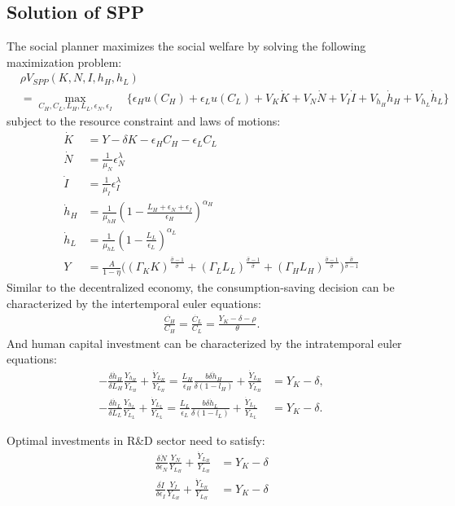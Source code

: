 \documentclass[12pt]{article}
\begin{document}
\subsection{Solution of SPP}
The social planner maximizes the social welfare by solving the following maximization problem:
\begin{align*}
&\rho V_{SPP}(K,N,I,h_H,h_L)  \\
&= \max_{C_H, C_L,L_H,L_L,\epsilon_N, \epsilon_I} \quad \{\epsilon_H u(C_H)+\epsilon_L u(C_L)+V_K\dot{K}+V_N\dot{N}+V_I\dot{I}+V_{h_H}\dot{h}_H+V_{h_L}\dot{h}_L\}
\end{align*}
subject to the resource constraint and laws of motions: 
\begin{align*}
\dot{K} &= Y-\delta K-\epsilon_H C_H-\epsilon_L C_L \\
\dot{N} &= \frac{1}{\mu_N}\epsilon_N^{\lambda} \\
\dot{I} &= \frac{1}{\mu_I}\epsilon_I^{\lambda} \\
\dot{h}_H &= \frac{1}{\mu_{hH}} (1-\frac{L_H+\epsilon_N+\epsilon_I}{\epsilon_H})^{\alpha_H} \\
\dot{h}_L &= \frac{1}{\mu_{hL}} (1-\frac{L_L}{\epsilon_L})^{\alpha_L} \\
Y &= \frac{A}{1-\eta}\Big((\Gamma_KK)^{\frac{\hat{\sigma}-1}{\hat{\sigma}}}+(\Gamma_LL_L)^{\frac{\hat{\sigma}-1}{\hat{\sigma}}}+(\Gamma_HL_H)^{\frac{\hat{\sigma}-1}{\hat{\sigma}}}\Big)^{\frac{\hat{\sigma}}{\hat{\sigma}-1}}
\end{align*}
Similar to the decentralized economy, the consumption-saving decision can be characterized by the intertemporal euler equations:
\begin{align*}
\frac{\dot{C_H}}{C_H} = \frac{\dot{C_L}}{C_L} = \frac{Y_K-\delta-\rho}{\theta}.
\end{align*}
And human capital investment can be characterized by the intratemporal euler equations: 
\begin{align*}
-\frac{\delta \dot{h}_H}{\delta L_H}\frac{Y_{h_H}}{Y_{L_H}}+\frac{\dot{Y}_{L_H}}{Y_{L_H}} = \frac{L_H}{\epsilon_H}\frac{b \delta \dot{h}_H}{\delta(1-l_H)}+\frac{\dot{Y}_{L_H}}{Y_{L_H}} &= Y_K-\delta, \\
-\frac{\delta \dot{h}_L}{\delta L_L}\frac{Y_{h_L}}{Y_{L_L}}+\frac{\dot{Y}_{L_L}}{Y_{L_L}} = \frac{L_L}{\epsilon_L}\frac{b \delta \dot{h}_L}{\delta(1-l_L)}+\frac{\dot{Y}_{L_L}}{Y_{L_L}} &= Y_K-\delta. 
\end{align*}

Optimal investments in R\&D sector need to satisfy: 
\begin{align*}
\frac{\delta \dot{N}}{\delta \epsilon_N}\frac{Y_N}{Y_{L_H}}+\frac{\dot{Y}_{L_H}}{Y_{L_H}} &= Y_K-\delta \\
\frac{\delta \dot{I}}{\delta \epsilon_I}\frac{Y_I}{Y_{L_H}}+\frac{\dot{Y}_{L_H}}{Y_{L_H}} &= Y_K-\delta  
\end{align*}
\end{document}
